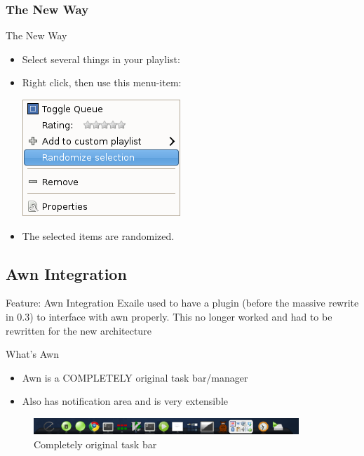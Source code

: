 \documentclass{beamer}
\begin{document}
\subsubsection{The New Way}
\begin{frame}{The New Way}
  \begin{itemize}
  \item Select several things in your playlist:
  \item Right click, then use this menu-item:

    \includegraphics[keepaspectratio]{images/randomize-menu-item}
  \item The selected items are randomized.
  \end{itemize}
\end{frame}

\subsection{Awn Integration}
\begin{frame}{Feature: Awn Integration}
Exaile used to have a plugin (before the massive rewrite in 0.3) to interface
with awn properly. This no longer worked and had to be rewritten for the new
architecture
\end{frame}

\begin{frame}{What's Awn}
  \begin{itemize}
    \item Awn is a COMPLETELY original task bar/manager
    \item Also has notification area and is very extensible
  \end{itemize}
  \begin{figure}
    \centering
    \includegraphics[width=100mm]{images/awn}
    \caption{Completely original task bar}
  \end{figure}
\end{frame}
\end{document}
